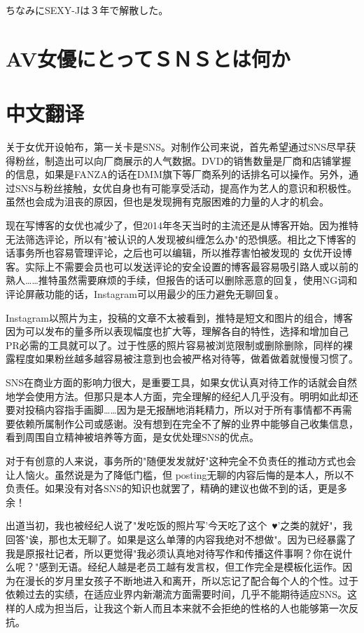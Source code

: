 \documentclass[12pt,UTF8]{ctexbook}
\begin{document}
ちなみにSEXY-Jは３年で解散した。


\section{AV女優にとってＳＮＳとは何か}


\section*{中文翻译}

关于女优开设帕布，第一关卡是SNS。对制作公司来说，首先希望通过SNS尽早获得粉丝，制造出可以向厂商展示的人气数据。DVD的销售数量是厂商和店铺掌握的信息，如果是FANZA的话在DMM旗下等厂商系列的话排名可以操作。另外，通过SNS与粉丝接触，女优自身也有可能享受活动，提高作为艺人的意识和积极性。虽然也会成为沮丧的原因，但也是发现拥有克服困难的力量的人才的机会。

现在写博客的女优也减少了，但2014年冬天当时的主流还是从博客开始。因为推特无法筛选评论，所以有"被认识的人发现被纠缠怎么办"的恐惧感。相比之下博客的话事务所也容易管理评论，之后也可以编辑，所以推荐害怕被发现的 女优开设博客。实际上不需要会员也可以发送评论的安全设置的博客最容易吸引路人或以前的熟人……推特虽然需要麻烦的手续，但报告的话可以删除恶意的回复，使用NG词和评论屏蔽功能的话，Instagram可以用最少的压力避免无聊回复。

Instagram以照片为主，投稿的文章不太被看到，推特是短文和图片的组合，博客因为可以发布的量多所以表现幅度也扩大等，理解各自的特性，选择和增加自己PR必需的工具就可以了。过于性感的照片容易被浏览限制或删除删除，同样的裸露程度如果粉丝越多越容易被注意到也会被严格对待等，做着做着就慢慢习惯了。

SNS在商业方面的影响力很大，是重要工具，如果女优认真对待工作的话就会自然地学会使用方法。但那只是本人方面，完全理解的经纪人几乎没有。明明如此却还要对投稿内容指手画脚……因为是无报酬地消耗精力，所以对于所有事情都不再需要依赖所属制作公司或感谢。没有想到在完全不了解的业界中能够自己收集信息，看到周围自立精神被培养等方面，是女优处理SNS的优点。

对于有创意的人来说，事务所的"随便发发就好"这种完全不负责任的推动方式也会让人恼火。虽然说是为了降低门槛，但 posting无聊的内容后悔的是本人，所以不负责任。如果没有对各SNS的知识也就罢了，精确的建议也做不到的话，更是多余！

出道当初，我也被经纪人说了"发吃饭的照片写'今天吃了这个~♥'之类的就好"，我回答"诶，那也太无聊了。如果是这么单薄的内容我绝对不想做"。因为已经暴露了我是原报社记者，所以更觉得"我必须认真地对待写作和传播这件事啊？你在说什么呢？"感到无语。经纪人越是老员工越有发言权，但工作完全是模板化运作。因为在漫长的岁月里女孩子不断地进入和离开，所以忘记了配合每个人的个性。过于依赖过去的实绩，在适应业界内新潮流方面需要时间，几乎不能期待适应SNS。这样的人成为担当后，让我这个新人而且本来就不会拒绝的性格的人也能够第一次反抗。
\end{document}
